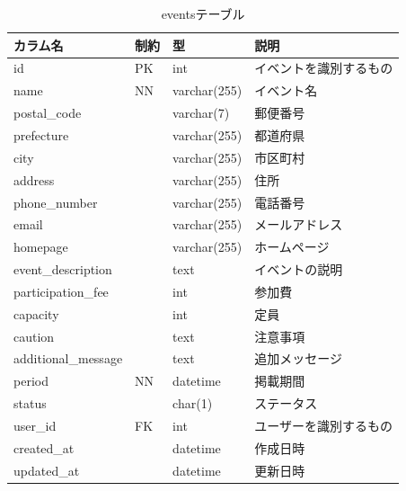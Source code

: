 \begin{table}[H]
  \centering
  \caption{eventsテーブル}
  \label{tab:db-events}
  \begin{tabular}{|l|l|l|l|} \hline
    カラム名                & 制約 & 型            & 説明          \\ \hline \hline
    id                  & PK & int          & イベントを識別するもの \\ \hline
    name                & NN & varchar(255) & イベント名       \\ \hline
    postal\_code        &    & varchar(7)   & 郵便番号        \\ \hline
    prefecture          &    & varchar(255) & 都道府県        \\ \hline
    city                &    & varchar(255) & 市区町村        \\ \hline
    address             &    & varchar(255) & 住所          \\ \hline
    phone\_number       &    & varchar(255) & 電話番号        \\ \hline
    email               &    & varchar(255) & メールアドレス     \\ \hline
    homepage            &    & varchar(255) & ホームページ      \\ \hline
    event\_description  &    & text         & イベントの説明     \\ \hline
    participation\_fee  &    & int          & 参加費         \\ \hline
    capacity            &    & int          & 定員          \\ \hline
    caution             &    & text         & 注意事項        \\ \hline
    additional\_message &    & text         & 追加メッセージ     \\ \hline
    period              & NN & datetime     & 掲載期間        \\ \hline
    status              &    & char(1)      & ステータス       \\ \hline
    user\_id            & FK & int          & ユーザーを識別するもの \\ \hline
    created\_at         &    & datetime     & 作成日時        \\ \hline
    updated\_at         &    & datetime     & 更新日時        \\ \hline
  \end{tabular}
\end{table}

